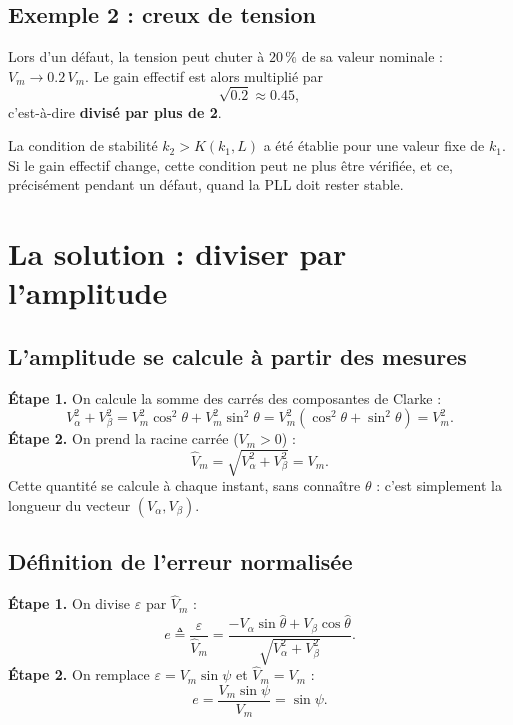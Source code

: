 \documentclass[11pt,a4paper]{article}
\numberwithin{equation}{section}
\newcommand{\hth}{\hat{\theta}}
\begin{document}
\subsection{Exemple 2 : creux de tension}
Lors d'un défaut, la tension peut chuter à $20\,\%$ de sa valeur nominale : $V_m\to0.2\,V_m$.
Le gain effectif est alors multiplié par
\begin{equation}
\sqrt{0.2}\approx0.45 ,
\end{equation}
c'est-à-dire \textbf{divisé par plus de 2}.

La condition de stabilité $k_2>K(k_1,L)$ a été établie pour une valeur fixe de $k_1$.
Si le gain effectif change, cette condition peut ne plus être vérifiée,
et ce, précisément pendant un défaut, quand la PLL doit rester stable.

\section{La solution : diviser par l'amplitude}

\subsection{L'amplitude se calcule à partir des mesures}
\textbf{Étape 1.} On calcule la somme des carrés des composantes de Clarke :
\begin{equation}
V_\alpha^2+V_\beta^2 = V_m^2\cos^2\theta + V_m^2\sin^2\theta = V_m^2\left(\cos^2\theta+\sin^2\theta\right) = V_m^2 .
\end{equation}
\textbf{Étape 2.} On prend la racine carrée ($V_m>0$) :
\begin{equation}
\boxed{\hat V_m = \sqrt{V_\alpha^2+V_\beta^2} = V_m .}
\end{equation}
Cette quantité se calcule à chaque instant, sans connaître $\theta$ : c'est simplement la longueur du
vecteur $(V_\alpha,V_\beta)$.

\subsection{Définition de l'erreur normalisée}
\textbf{Étape 1.} On divise $\varepsilon$ par $\hat V_m$ :
\begin{equation}
e \triangleq \frac{\varepsilon}{\hat V_m} = \frac{-V_\alpha\sin\hth+V_\beta\cos\hth}{\sqrt{V_\alpha^2+V_\beta^2}} .
\end{equation}
\textbf{Étape 2.} On remplace $\varepsilon=V_m\sin\psi$ et $\hat V_m = V_m$ :
\begin{equation}
e = \frac{V_m\sin\psi}{V_m} = \sin\psi .
\end{equation}
\end{document}
